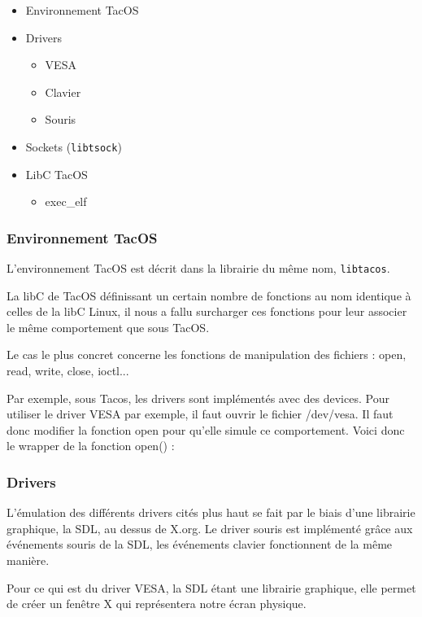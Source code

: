 \begin{itemize}
  \item Environnement TacOS
  \item Drivers
  \begin{itemize}
    \item VESA
    \item Clavier
    \item Souris 
  \end{itemize}
  \item Sockets (\verb|libtsock|)
  \item LibC TacOS
  \begin{itemize}
    \item exec\_elf
  \end{itemize}
\end{itemize}

\subsubsection{Environnement TacOS}

L'environnement TacOS est décrit dans la librairie du même nom, \verb|libtacos|.

La libC de TacOS définissant un certain nombre de fonctions au nom identique à celles de la libC Linux, il nous a fallu surcharger ces fonctions pour leur associer le même comportement que sous TacOS.

Le cas le plus concret concerne les fonctions de manipulation des fichiers : open, read, write, close, ioctl...

Par exemple, sous Tacos, les drivers sont implémentés avec des devices.
Pour utiliser le driver VESA par exemple, il faut ouvrir le fichier /dev/vesa.
Il faut donc modifier la fonction open pour qu'elle simule ce comportement.
Voici donc le wrapper de la fonction open() :



\subsubsection{Drivers}

L'émulation des différents drivers cités plus haut se fait par le biais d'une librairie graphique, la SDL, au dessus de X.org.
Le driver souris est implémenté grâce aux événements souris de la SDL, les événements clavier fonctionnent de la même manière.

Pour ce qui est du driver VESA, la SDL étant une librairie graphique, elle permet de créer un fenêtre X qui représentera notre écran physique. 

